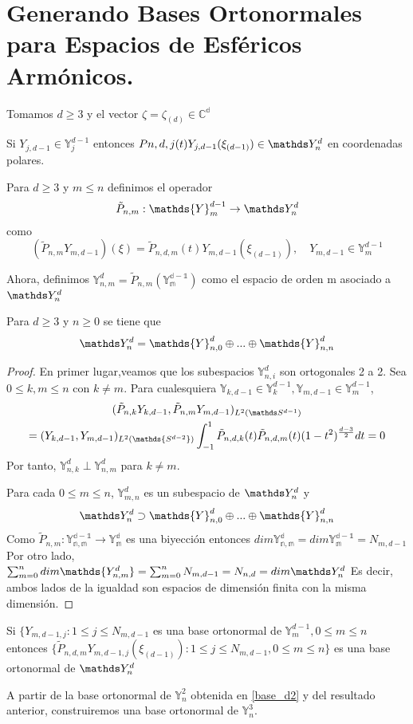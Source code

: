 \section{Generando Bases Ortonormales para Espacios de Esféricos Armónicos.}
Tomamos $d\ge3$ y el vector $\zeta = \zeta_{(d)} \in \mathds{C^{d}}$ 
\begin{prop}Si $Y_{j,d-1}\in\mathds{Y}_j^{d-1}$ entonces $P{n,d,j}(t)Y_{j,d-1}(\xi_{(d-1)})\in\spharm$ en coordenadas polares.
\end{prop}
\begin{defn}
Para $d\ge3$ y $m\le n$ definimos el operador $$ \tilde{P}_{n,m} : \mathds{Y}_m^{d-1} \to \spharm
$$
como
$$
(\tilde{P}_{n,m}Y_{m,d-1})(\xi) = \tilde{P}_{n,d,m}(t)Y_{m,d-1}(\xi_{(d-1)}), \quad Y_{m,d-1} \in \mathds{Y}_m^{d-1}
$$
\end{defn}
Ahora, definimos $\mathds{Y}^d_{n,m} = \tilde{P}_{n,m}(\mathds{Y_{m}^{d-1}})$ como el espacio de orden m asociado a $\spharm$
\begin{thm}Para $d\ge 3$ y $n\ge 0$ se tiene que $$
	\spharm = \mathds{Y}^d_{n,0} \oplus ... \oplus \mathds{Y}^d_{n,n}
$$
\end{thm}
\begin{proof}
En primer lugar,veamos que los subespacios $\mathds{Y}^d_{n,i}$ son ortogonales 2 a 2. Sea $0\le k,m\le n$ con $k \neq m$. Para cualesquiera $\mathds{Y}_{k,d-1}\in\mathds{Y}_k^{d-1},\mathds{Y}_{m,d-1}\in\mathds{Y}_m^{d-1}$,
\begin{gather}
(\tilde{P}_{n,k}Y_{k,d-1},\tilde{P}_{n,m}Y_{m,d-1})_{L^2(\sphere)} \\= (Y_{k,d-1},Y_{m,d-1})_{L^2(\mathds{S^{d-2}})}\int_{-1}^{1} \tilde{P}_{n,d,k}(t)\tilde{P}_{n,d,m}(t)(1-t^2)^{\frac{d-3}{2}}dt = 0
\end{gather}
Por tanto, $\mathds{Y}^d_{n,k}\perp\mathds{Y}^d_{n,m}$ para $k\neq m$.

Para cada $0\le m\le n$, $\mathds{Y}^d_{m,n}$ es un subespacio de $\spharm$ y $$
\spharm \supset \mathds{Y}^d_{n,0} \oplus ... \oplus \mathds{Y}^d_{n,n}$$
Como $\tilde{P}_{n,m}:\mathds{Y_{n,m}^{d-1}} \to \mathds{Y_{m}^{d}}$ es una biyección entonces $dim \mathds{Y_{n,m}^{d}} = dim \mathds{Y_{m}^{d-1}} = N_{m,d-1}$
Por otro lado, $\sum_{m=0}^{n} dim \mathds{Y_{n,m}^{d}} = \sum_{m=0}^{n} N_{m,d-1} =  N_{n,d} = dim \spharm$
Es decir, ambos lados de la igualdad son espacios de dimensión finita con la misma dimensión.
\end{proof}
\begin{rem}Si $\{Y_{m,d-1,j}:1\le j \le N_{m,d-1}$ es una base ortonormal de $\mathds{Y}_m^{d-1}, 0\le m\le n$ entonces $\{\tilde{P}_{n,d,m}Y_{m,d-1,j}(\xi_{(d-1)}):1\le j \le N_{m,d-1}, 0\le m \le n\}$ es una base ortonormal de $\spharm$
\end{rem}
A partir de la base ortonormal de $\mathds{Y}^2_n$ obtenida en \hyperref[]{\ref{base_d2}} y del resultado anterior, construiremos una base ortonormal de $\mathds{Y}^3_n$.

